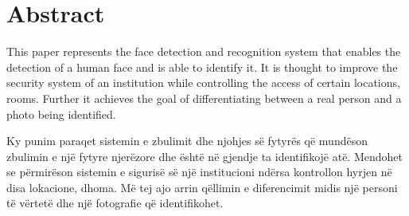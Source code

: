 %
%
\newpage

%
%
\section*{Abstract}


\color{black} 
\begin{flushleft}
This paper represents the face detection and recognition system that enables the detection of a human face and is able to identify it. It is thought to improve the security system of an institution while controlling the access of certain locations, rooms. Further it achieves the goal of differentiating between a real person and a photo being identified. \\
\end{flushleft}
\begin{flushleft}
	Ky punim paraqet sistemin e zbulimit dhe njohjes së fytyrës që mundëson zbulimin e një fytyre njerëzore dhe është në gjendje ta identifikojë atë. Mendohet se përmirëson sistemin e sigurisë së një institucioni ndërsa kontrollon hyrjen në disa lokacione, dhoma. Më tej ajo arrin qëllimin e diferencimit midis një personi të vërtetë dhe një fotografie që identifikohet.
\end{flushleft}
\color{black} 
